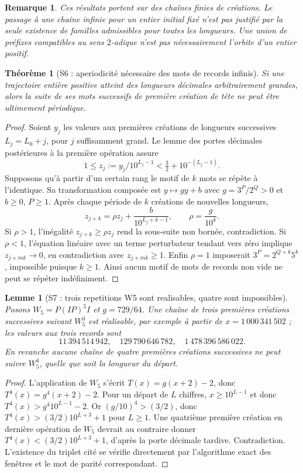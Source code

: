 \documentclass[11pt,a4paper]{article}
\newtheorem{lemma}{Lemme}
\newtheorem{theorem}{Théorème}
\newtheorem{remark}{Remarque}
\begin{document}
\begin{remark}Ces résultats portent sur des chaînes finies de créations. Le passage à une chaîne infinie pour \emph{un entier initial fixé} n'est pas justifié par la seule existence de familles admissibles pour toutes les longueurs. Une union de préfixes compatibles au sens $2$-adique n'est pas nécessairement l'orbite d'un entier positif.\end{remark}

\begin{theorem}[S6 : aperiodicité nécessaire des mots de records infinis]
Si une trajectoire entière positive atteint des longueurs décimales arbitrairement grandes, alors la suite de ses mots successifs de \emph{première création de tête} ne peut être ultimement périodique.
\end{theorem}
\begin{proof}
Soient $y_j$ les valeurs aux premières créations de longueurs successives $L_j=L_0+j$, pour $j$ suffisamment grand. Le lemme des portes décimales postérieures à la première opération assure
\[
1\le z_j:=y_j/10^{L_j-1}<\tfrac32+10^{-(L_j-1)}.
\]
Supposons qu'à partir d'un certain rang le motif de $k$ mots se répète à l'identique. Sa transformation composée est $y\mapsto gy+b$ avec $g=3^P/2^Q>0$ et $b\ge0$, $P\ge1$. Après chaque période de $k$ créations de nouvelles longueurs,
\[
z_{j+k}=\rho z_j+\frac{b}{10^{L_j+k-1}},\qquad \rho=\frac{g}{10^k}.
\]
Si $\rho>1$, l'inégalité $z_{j+k}\ge\rho z_j$ rend la sous-suite non bornée, contradiction. Si $\rho<1$, l'équation linéaire avec un terme perturbateur tendant vers zéro implique $z_{j+mk}\to0$, en contradiction avec $z_{j+mk}\ge1$. Enfin $\rho=1$ imposerait $3^P=2^{Q+k}5^k$, impossible puisque $k\ge1$. Ainsi aucun motif de mots de records non vide ne peut se répéter indéfiniment.\end{proof}
\begin{lemma}[S7 : trois repetitions W5 sont realisables, quatre sont impossibles]
Posons $W_5=P(IP)^5I$ et $g=729/64$. Une chaîne de trois premières créations successives suivant $W_5^3$ est réalisable, par exemple à partir de $x=1\,000\,341\,502$ ; les valeurs aux trois records sont
\[
11\,394\,514\,942,\quad129\,790\,646\,782,\quad1\,478\,396\,586\,022.
\]
En revanche aucune chaîne de quatre premières créations successives ne peut suivre $W_5^4$, quelle que soit la longueur du départ.
\end{lemma}
\begin{proof}L'application de $W_5$ s'écrit $T(x)=g(x+2)-2$, donc $T^4(x)=g^4(x+2)-2$. Pour un départ de $L$ chiffres, $x\ge10^{L-1}$ et donc $T^4(x)>g^4 10^{L-1}-2$. Or $(g/10)^4>(3/2)$, donc $T^4(x)>(3/2)10^{L+3}+1$ pour $L\ge1$. Une quatrième première création en dernière opération de $W_5$ devrait au contraire donner $T^4(x)<(3/2)10^{L+3}+1$, d'après la porte décimale tardive. Contradiction. L'existence du triplet cité se vérifie directement par l'algorithme exact des fenêtres et le mot de parité correspondant.\end{proof}
\end{document}
